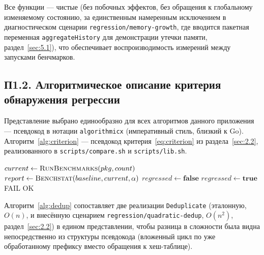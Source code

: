 \documentclass[12pt,a4paper]{article}
\numberwithin{equation}{section}
\begin{document}
Все функции — чистые (без побочных эффектов, без обращения к глобальному
изменяемому состоянию, за единственным намеренным исключением в
диагностическом сценарии \texttt{regression/\allowbreak memory-growth}, где вводится
пакетная переменная \texttt{aggregateHistory} для демонстрации утечки
памяти, раздел~\ref{sec:5.1}), что обеспечивает воспроизводимость измерений
между запусками бенчмарков.

\subsection*{П1.2. Алгоритмическое описание критерия обнаружения регрессии}

Представление выбрано единообразно для всех алгоритмов данного приложения —
псевдокод в нотации \texttt{algorithmicx} (императивный стиль, близкий к
Go). Алгоритм~\ref{alg:criterion} — псевдокод критерия~\eqref{eq:criterion}
из раздела~\ref{sec:2.2}, реализованного в \texttt{scripts/\allowbreak compare.sh} и
\texttt{scripts/\allowbreak lib.sh}.

\begin{algorithm}[htbp]
\caption{Обнаружение регрессии производительности}
\label{alg:criterion}
\begin{algorithmic}[1]
  \State $current \gets \Call{RunBenchmarks}{pkg, count}$ 
  \State $report \gets \Call{Benchstat}{baseline, current, \alpha}$ 
  \State $regressed \gets \textbf{false}$
   
      \State $regressed \gets \textbf{true}$
      \State {}
    \EndIf
  \EndFor
    \State \Return FAIL 
  \Else
    \State \Return OK
  \EndIf
\EndFunction
\end{algorithmic}
\end{algorithm}

Алгоритм~\ref{alg:dedup} сопоставляет две реализации \texttt{Deduplicate}
(эталонную, $O(n)$, и внесённую сценарием \texttt{regression/\allowbreak quadratic-dedup},
$O(n^2)$, раздел~\ref{sec:2.2}) в едином представлении, чтобы разница в
сложности была видна непосредственно из структуры псевдокода (вложенный
цикл по уже обработанному префиксу вместо обращения к хеш-таблице).
\end{document}
